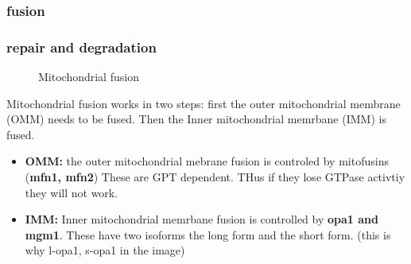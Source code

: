 \documentclass[../main.tex]{subfiles}
\begin{document}
\subsubsection{fusion}
\subsubsection{repair and degradation}
\begin{figure}[H]
	\centering
	\caption{Mitochondrial fusion}
\end{figure}
Mitochondrial fusion works in two steps: first the outer mitochondrial membrane (OMM) needs to be fused. Then the Inner mitochondrial memrbane (IMM) is fused. 
\begin{itemize}
    \item \textbf{OMM:} the outer mitochondrial mebrane fusion is controled by mitofusins (\textbf{\gls{mfn1}, \gls{mfn2}}) These are GPT dependent. THus if they lose GTPase activtiy they will not work.

    \item \textbf{IMM:} Inner mitochondrial memrbane fusion is controlled by \textbf{\gls{opa1} and \gls{mgm1}}. These have two isoforms the long form and the short form. (this is why l-opa1, s-opa1 in the image)
\end{itemize}
















    
	
	
\end{document}
